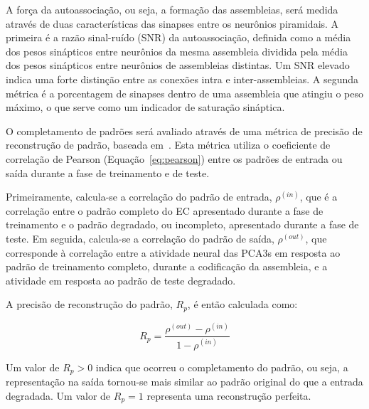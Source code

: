 A força da autoassociação, ou seja, a formação das assembleias, será medida através de duas características das sinapses entre os
neurônios piramidais. A primeira é a razão sinal-ruído (SNR) da autoassociação, definida como a média dos pesos sinápticos entre
neurônios da mesma assembleia dividida pela média dos pesos sinápticos entre neurônios de assembleias distintas. Um SNR elevado
indica uma forte distinção entre as conexões intra e inter-assembleias. A segunda métrica é a porcentagem de sinapses dentro de
uma assembleia que atingiu o peso máximo, o que serve como um indicador de saturação sináptica.

O completamento de padrões será avaliado através de uma métrica de precisão de reconstrução de padrão, baseada
em~\cite{kopsickFormation2024}. Esta métrica utiliza o coeficiente de correlação de Pearson (Equação~\ref{eq:pearson}) entre os
padrões de entrada ou saída durante a fase de treinamento e de teste. 

Primeiramente, calcula-se a correlação do padrão de entrada, $\rho^{(in)}$, que é a correlação entre o padrão completo do EC
apresentado durante a fase de treinamento e o padrão degradado, ou incompleto, apresentado durante a fase de teste. Em seguida,
calcula-se a correlação do padrão de saída, $\rho^{(out)}$, que corresponde à correlação entre a atividade neural das PCA3s em
resposta ao padrão de treinamento completo, durante a codificação da assembleia, e a atividade em resposta ao padrão de teste
degradado.

A precisão de reconstrução do padrão, $R_p$, é então calculada como:

\begin{equation}
    \label{eq:rp}
    R_p = \frac{\rho^{(out)} - \rho^{(in)}}{1 - \rho^{(in)}}
\end{equation}

Um valor de $R_p > 0$ indica que ocorreu o completamento do padrão, ou seja, a representação na saída tornou-se mais similar ao
padrão original do que a entrada degradada. Um valor de $R_p = 1$ representa uma reconstrução perfeita.

